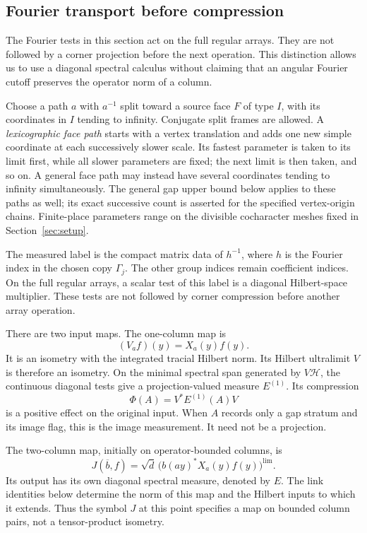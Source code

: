 \subsection{Fourier transport before compression}

The Fourier tests in this section act on the full regular arrays.
They are not followed by a corner projection before the next
operation. This distinction allows us to use a diagonal spectral
calculus without claiming that an angular Fourier cutoff preserves
the operator norm of a column.

Choose a path \(a\) with \(a^{-1}\) split toward a source face
\(F\) of type \(I\), with its coordinates in \(I\) tending to
infinity. Conjugate split frames are allowed. A \emph{lexicographic
face path} starts with a vertex translation and adds one new simple
coordinate at each successively slower scale. Its fastest parameter
is taken to its limit first, while all slower parameters are fixed;
the next limit is then taken, and so on. A general face path may
instead have several coordinates tending to infinity simultaneously.
The general gap upper bound below applies to these paths as well;
its exact successive count is asserted for the specified
vertex-origin chains. Finite-place parameters range on the divisible
cocharacter meshes fixed in Section~\ref{sec:setup}.

The measured label is the compact matrix data of $h^{-1}$, where $h$
is the Fourier index in the chosen copy $\Gamma_j$. The other group
indices remain coefficient indices. On the full regular arrays, a scalar
test of this label is a diagonal Hilbert-space multiplier. These tests
are not followed by corner compression before another array operation.

There are two input maps. The one-column map is
\[
 (V_a f)(y)=X_a(y)f(y).
\]
It is an isometry with the integrated tracial Hilbert norm. Its Hilbert
ultralimit $V$ is therefore an isometry. On the minimal spectral span
generated by $V\mathcal H$, the continuous diagonal tests give a
projection-valued measure $E^{(1)}$. Its compression
\[
 \Phi(A)=V^*E^{(1)}(A)V
\]
is a positive effect on the original input. When $A$ records only a gap
stratum and its image flag, this is the image measurement. It need not
be a projection.

The two-column map, initially on operator-bounded columns, is
\begin{equation}
 J(\overline b,f)
  =\sqrt d\,\bigl(b(ay)^*X_a(y)f(y)\bigr)^{\lim}.
 \label{eq:input-1}
\end{equation}
Its output has its own diagonal spectral measure, denoted by $E$.
The link identities below determine the norm of this map and the
Hilbert inputs to which it extends. Thus the symbol $J$ at this point
specifies a map on bounded column pairs, not a tensor-product isometry.

